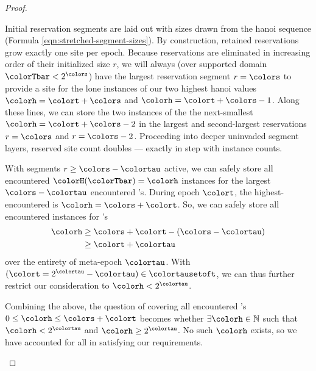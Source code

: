 \begin{proof}
\begin{proofpart}
Initial reservation segments are laid out with sizes drawn from the hanoi sequence (Formula \ref{eqn:stretched-segment-sizes}).
By construction, retained reservations grow exactly one site per epoch.
Because reservations are eliminated in increasing order of their initialized size $r$, we will always (over supported domain $\colorTbar < 2^{\colors}$) have the largest reservation segment $r=\colors$ to provide a site for the lone instances of our two highest hanoi values $\colorh=\colort+\colors$ and $\colorh=\colort+\colors-1$.
Along these lines, we can store the two instances of the the next-smallest \hv{} $\colorh=\colort+\colors-2$ in the largest and second-largest reservations $r=\colors$ and $r=\colors-2$.
Proceeding into deeper uninvaded segment layers, reserved site count doubles --- exactly in step with \hv{} instance counts.

With segments $r \geq \colors - \colortau$ active, we can safely store all encountered \hv{} $\colorH(\colorTbar) = \colorh$ instances for the largest $\colors - \colortau$ encountered \hv's.
During epoch $\colort$, the highest-encountered \hv{} is $\colorh=\colors + \colort$.
So, we can safely store all encountered instances for \hv{}'s
\begin{align*}
\colorh
&\geq
\colors + \colort - (\colors - \colortau)\\
&\geq
\colort + \colortau
\end{align*}
over the entirety of meta-epoch $\colortau$.
With $(\colort = 2^{\colortau} - \colortau) \in \colortausetoft$, we can thus further restrict our consideration to $\colorh < 2^{\colortau}$.
\end{proofpart}

\begin{proofpart}
Combining the above, the question of covering all encountered \hv's $0\leq\colorh\leq\colors+\colort$ becomes whether $\exists \colorh \in \mathbb{N}$ such that $\colorh < 2^{\colortau}$ and $\colorh \geq 2^{\colortau}$.
No such $\colorh$ exists, so we have accounted for all \hv{} in satisfying our requirements.
\end{proofpart}

\end{proof}
